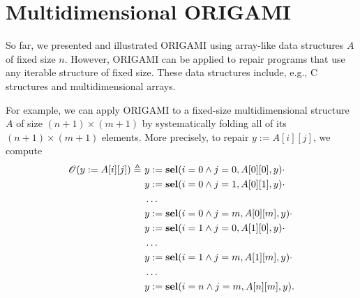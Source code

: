 \section{Multidimensional ORIGAMI}
So far, we presented and illustrated ORIGAMI using array-like data structures $A$ of fixed size $n$. However, ORIGAMI can be applied to repair programs that use any iterable structure of fixed size. These data structures include, e.g., C structures and multidimensional arrays. 

For example, we can apply ORIGAMI to a fixed-size multidimensional structure $A$ of size $(n+1)\times (m+1)$ by systematically folding all of its $(n+1)\times (m+1)$ elements. More precisely, to repair $y:=A[i][j]$, we compute
\begin{align*}
    \mathscr{O}(y:=A[i][j])\triangleq\  
    &y:=\textbf{sel}(i=0\land j=0,A[0][0],y)\cdot \\
    &y:=\textbf{sel}(i=0\land j=1,A[0][1],y)\cdot \\
    &\ldots\\
    &y:=\textbf{sel}(i=0\land j=m,A[0][m],y)\cdot \\
    &y:=\textbf{sel}(i=1\land j=0,A[1][0],y)\cdot \\
    &\ldots\\
    &y:=\textbf{sel}(i=1\land j=m,A[1][m],y)\cdot \\
    &\ldots\\
    &y:=\textbf{sel}(i=n\land j=m,A[n][m],y).
\end{align*}
